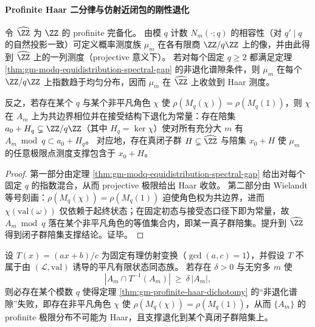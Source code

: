 \paragraph{Profinite Haar 二分律与仿射近闭包的刚性退化}
\begin{theorem}\label{thm:gm-profinite-haar-dichotomy}
令 \(\widehat{\ZZ}\) 为 \(\ZZ\) 的 profinite 完备化。
由模 \(q\) 计数 \(N_m(\cdot;q)\) 的相容性（对 \(q'\mid q\) 的自然投影一致）可定义概率测度族 \(\mu_m\) 在各有限商 \(\ZZ/q\ZZ\) 上的像，并由此得到 \(\widehat{\ZZ}\) 上的一列测度（projective 意义下）。
若对每个固定 \(q\ge 2\) 都满足定理 \ref{thm:gm-modq-equidistribution-spectral-gap} 的非退化谱隙条件，则 \(\mu_m\) 在每个 \(\ZZ/q\ZZ\) 上指数趋于均匀分布，因而 \(\mu_m\) 在 \(\widehat{\ZZ}\) 上收敛到 Haar 测度。
\par
反之，若存在某个 \(q\) 与某个非平凡角色 \(\chi\) 使 \(\rho(M_q(\chi))=\rho(M_q(1))\)，则 \(\chi\) 在 \(A_m\) 上为共边界相位并在接受结构下退化为常量：存在陪集 \(a_0+H_q\subsetneq \ZZ/q\ZZ\)（其中 \(H_q=\ker\chi\)）使对所有充分大 \(m\) 有 \(A_m\bmod q\subset a_0+H_q\)。
对应地，存在真闭子群 \(H\subsetneq \widehat{\ZZ}\) 与陪集 \(x_0+H\) 使 \(\mu_m\) 的任意极限点测度支撑包含于 \(x_0+H\)。
\end{theorem}

\begin{proof}
第一部分由定理 \ref{thm:gm-modq-equidistribution-spectral-gap} 给出对每个固定 \(q\) 的指数混合，从而 projective 极限给出 Haar 收敛。
第二部分由 Wielandt 等号刻画：\(\rho(M_q(\chi))=\rho(M_q(1))\) 迫使角色权为共边界，进而 \(\chi(\mathrm{val}(\omega))\) 仅依赖于起终状态；在固定初态与接受态口径下即为常量，故 \(A_m\bmod q\) 落在某个非平凡角色的等值集合内，即某一真子群陪集。提升到 \(\widehat{\ZZ}\) 得到闭子群陪集支撑结论。证毕。
\end{proof}

\begin{proposition}\label{prop:gm-affine-near-closure-profinite-degeneracy}
设 \(T(x)=(ax+b)/c\) 为固定有理仿射变换（\(\gcd(a,c)=1\)），并假设 \(T\) 不属于由 \((\mathcal{L},\mathrm{val})\) 诱导的平凡有限状态同态族。
若存在 \(\delta>0\) 与无穷多 \(m\) 使
\[
|A_m\cap T^{-1}(A_m)|\ \ge\ \delta\,|A_m|,
\]
则必存在某个模数 \(q\) 使得定理 \ref{thm:gm-profinite-haar-dichotomy} 的“非退化谱隙”失败，即存在非平凡角色 \(\chi\) 使 \(\rho(M_q(\chi))=\rho(M_q(1))\)，从而 \(\{A_m\}\) 的 profinite 极限分布不可能为 Haar，且支撑退化到某个真闭子群陪集上。
\end{proposition}

